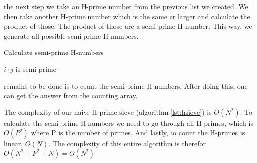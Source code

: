 \documentclass[11pt,a4paper,twoside]{article}
\begin{document}
 the next step we take an H-prime number from the previous list we
created. We then take another H-prime number which is the same or larger and
calculate the product of those. The product of those are a semi-prime H-number.
This way, we generate all possible semi-prime H-numbers.

\begin{algorithm}
    \caption{Calculate semi-prime H-numbers}
    \label{Semi-prime H-numbers}
    \begin{algorithmic}
                \STATE $i \cdot j$ is semi-prime
            \ENDFOR
        \ENDFOR
    \end{algorithmic}
\end{algorithm}

 remains to be done is to count the semi-prime H-numbers. After
doing this, one can get the answer from the counting array.

The complexity of our naive H-prime sieve (algorithm \ref{lst:hsieve}) is
$O(N^2)$. To calculate the semi-prime H-numbers we need to go through all
H-primes, which is $O(P^2)$ where P is the number of primes. And lastly, to
count the H-primes is linear, $O(N)$. The complexity of this entire algorithm
is therefor $O(N^2 + P^2 + N) = O(N^2)$

\end{document}

